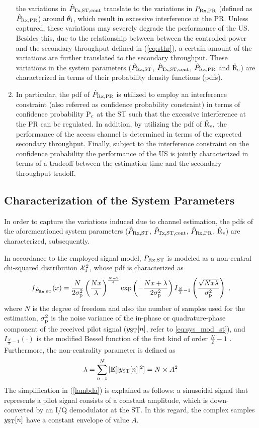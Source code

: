 \begin{enumerate}
the variations in $\hat{P}_{\text{Tx,ST,cont}}$ translate to the variations in $P_{\text{Rx,PR}}$ (defined as $\hat{P}_{\text{Rx,PR}}$) around $\theta_{\text{I}}$, which result in excessive interference at the PR. Unless captured, these variations may severely degrade the performance of the US. Besides this, due to the relationship between between the controlled power and the secondary throughput defined in (\ref{eq:sthr}), a certain amount of the variations are further translated to the secondary throughput. These variations in the system parameters ($\hat{P}_{\text{Rx,ST}}$, $\hat{P}_{\text{Tx,ST,cont}}$, $\hat{P}_{\text{Rx,PR}}$ and $\hat{\text{{R}}}_{\text{s}}$) are characterized in terms of their probability density functions (pdfs).  
	\item In particular, the pdf of $\hat{P}_{\text{Rx,PR}}$ is utilized to employ an interference constraint (also referred as confidence probability constraint) in terms of confidence probability $\text{P}_{\text{c}}$ at the ST such that the excessive interference at the PR can be regulated. In addition, by utilizing the pdf of $\hat{\text{{R}}}_{\text{s}}$, the performance of the access channel is determined in terms of the expected secondary throughput. Finally, subject to the interference constraint on the confidence probability the performance of the US is jointly characterized in terms of a tradeoff between the estimation time and the secondary throughput tradoff. 
\end{enumerate}

\subsection{Characterization of the System Parameters}
In order to capture the variations induced due to channel estimation, the pdfs of the aforementioned system parameters ($\hat{P}_{\text{Rx,ST}}$, $\hat{P}_{\text{Tx,ST,cont}}$, $\hat{P}_{\text{Rx,PR}}$, $\hat{\text{{R}}}_{\text{s}}$) are characterized, subsequently. 

In accordance to the employed signal model, $P_{\text{Rx,ST}}$ is modeled as a non-central chi-squared distribution $\ncchi2$, whose pdf is characterized as \cite{Char99}
\begin{equation}
	\label{nxc2equ}
	f_{\hat{P}_{\text{Rx,ST}}} (x) = 
	\frac{N}{2\sigma_\textrm{p}^2} \left(\frac{N x}{\lambda}\right)^\frac{N-2}{4}  
	\exp\left(-\frac{N x+\lambda}{2\sigma_\textrm{p}^2}\right)  I_{\frac{N}{2}-1}\left(\frac{\sqrt{N x\lambda}}{\sigma_\textrm{p}^2}\right) \;  ,
\end{equation}
where $N$ is the degree of freedom and also the number of samples used for the estimation, $\sigma^2_{\text{p}}$ is the noise variance of the in-phase or quadrature-phase component of the received pilot signal ($y_{\text{ST}}[n]$, refer to \ref{eq:sys_mod_st}), and $I_{\frac{N}{2}-1}(\cdot)$ is the modified Bessel function of the first kind of order $\frac{N}{2}-1$ \cite{Jef00}. Furthermore, the non-centrality parameter is defined as
\begin{equation}
	\label{lambda}
	\lambda = \sum_{n=1}^N |\mathbb{E}[|y_{\text{ST}}[n]|^2] = N \times A^2
\end{equation}
The simplification in (\ref{lambda}) is explained as follows: a sinusoidal signal that represents a pilot signal consists of a constant amplitude, which is down-converted by an I/Q demodulator at the ST. In this regard, the complex samples $y_{\text{ST}}[n]$ have a constant envelope of value $A$. 

